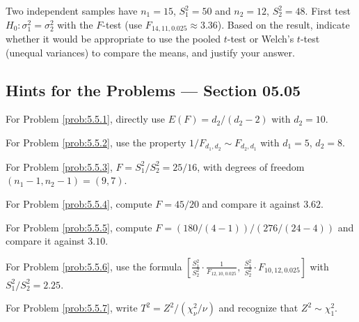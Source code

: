 \begin{problema}
	\label{prob:5.5.10}
	Two independent samples have $n_1=15$, $S_1^2=50$ and $n_2=12$, $S_2^2=48$. First test $H_0:\sigma_1^2=\sigma_2^2$ with the $F$-test (use $F_{14,11,0.025}\approx 3.36$). Based on the result, indicate whether it would be appropriate to use the pooled $t$-test or Welch's $t$-test (unequal variances) to compare the means, and justify your answer.
\end{problema}

\subsection*{Hints for the Problems --- Section 05.05}

\begin{sugerencia}
	\label{sug:5.5.1}
	For Problem \ref{prob:5.5.1}, directly use $E(F)=d_2/(d_2-2)$ with $d_2=10$.
\end{sugerencia}

\begin{sugerencia}
	\label{sug:5.5.2}
	For Problem \ref{prob:5.5.2}, use the property $1/F_{d_1,d_2}\sim F_{d_2,d_1}$ with $d_1=5$, $d_2=8$.
\end{sugerencia}

\begin{sugerencia}
	\label{sug:5.5.3}
	For Problem \ref{prob:5.5.3}, $F=S_1^2/S_2^2=25/16$, with degrees of freedom $(n_1-1,n_2-1)=(9,7)$.
\end{sugerencia}

\begin{sugerencia}
	\label{sug:5.5.4}
	For Problem \ref{prob:5.5.4}, compute $F=45/20$ and compare it against $3.62$.
\end{sugerencia}

\begin{sugerencia}
	\label{sug:5.5.5}
	For Problem \ref{prob:5.5.5}, compute $F=(180/(4-1))/(276/(24-4))$ and compare it against $3.10$.
\end{sugerencia}

\begin{sugerencia}
	\label{sug:5.5.6}
	For Problem \ref{prob:5.5.6}, use the formula $\left[\frac{S_1^2}{S_2^2}\cdot\frac{1}{F_{12,10,0.025}},\ \frac{S_1^2}{S_2^2}\cdot F_{10,12,0.025}\right]$ with $S_1^2/S_2^2=2.25$.
\end{sugerencia}

\begin{sugerencia}
	\label{sug:5.5.7}
	For Problem \ref{prob:5.5.7}, write $T^2=Z^2/(\chi^2_\nu/\nu)$ and recognize that $Z^2\sim\chi^2_1$.
\end{sugerencia}

